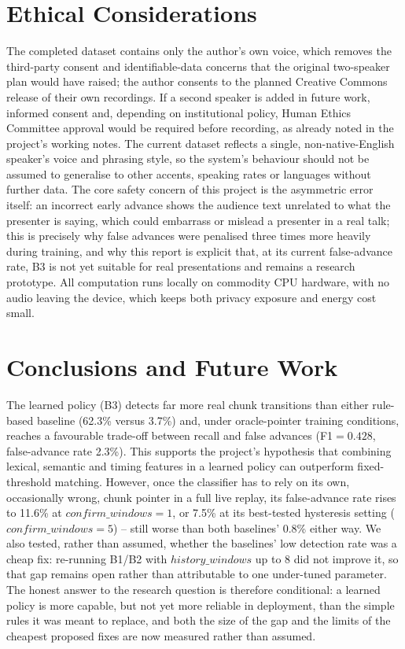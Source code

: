 \documentclass[conference,a4paper]{IEEEtran}
\begin{document}
\section{Ethical Considerations}
The completed dataset contains only the author's own voice, which removes the third-party consent and identifiable-data concerns that the original two-speaker plan would have raised; the author consents to the planned Creative Commons release of their own recordings. If a second speaker is added in future work, informed consent and, depending on institutional policy, Human Ethics Committee approval would be required before recording, as already noted in the project's working notes. The current dataset reflects a single, non-native-English speaker's voice and phrasing style, so the system's behaviour should not be assumed to generalise to other accents, speaking rates or languages without further data. The core safety concern of this project is the asymmetric error itself: an incorrect early advance shows the audience text unrelated to what the presenter is saying, which could embarrass or mislead a presenter in a real talk; this is precisely why false advances were penalised three times more heavily during training, and why this report is explicit that, at its current false-advance rate, B3 is not yet suitable for real presentations and remains a research prototype. All computation runs locally on commodity CPU hardware, with no audio leaving the device, which keeps both privacy exposure and energy cost small.

\section{Conclusions and Future Work}
\label{sec:conclusion}
The learned policy (B3) detects far more real chunk transitions than either rule-based baseline (62.3\% versus 3.7\%) and, under oracle-pointer training conditions, reaches a favourable trade-off between recall and false advances (F1\(=0.428\), false-advance rate 2.3\%). This supports the project's hypothesis that combining lexical, semantic and timing features in a learned policy can outperform fixed-threshold matching. However, once the classifier has to rely on its own, occasionally wrong, chunk pointer in a full live replay, its false-advance rate rises to 11.6\% at \(confirm\_windows=1\), or 7.5\% at its best-tested hysteresis setting (\(confirm\_windows=5\)) -- still worse than both baselines' 0.8\% either way. We also tested, rather than assumed, whether the baselines' low detection rate was a cheap fix: re-running B1/B2 with \(history\_windows\) up to 8 did not improve it, so that gap remains open rather than attributable to one under-tuned parameter. The honest answer to the research question is therefore conditional: a learned policy is more capable, but not yet more reliable in deployment, than the simple rules it was meant to replace, and both the size of the gap and the limits of the cheapest proposed fixes are now measured rather than assumed.
\end{document}

